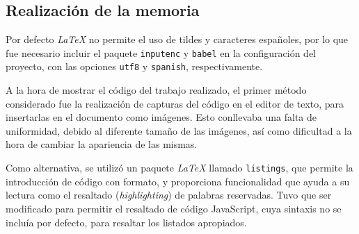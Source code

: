 \subsection{Realización de la memoria}

Por defecto \textit{LaTeX} no permite el uso de tildes y caracteres españoles, por lo que fue necesario incluir el paquete \texttt{inputenc} y \texttt{babel} en la configuración del proyecto, con las opciones \texttt{utf8} y \texttt{spanish}, respectivamente.

A la hora de mostrar el código del trabajo realizado, el primer método considerado fue la realización de capturas del código en el editor de texto, para insertarlas en el documento como imágenes.
Esto conllevaba una falta de uniformidad, debido al diferente tamaño de las imágenes, así como dificultad a la hora de cambiar la apariencia de las mismas.

Como alternativa, se utilizó un paquete \textit{LaTeX} llamado \texttt{listings}, que permite la introducción de código con formato, y proporciona funcionalidad que ayuda a su lectura como el resaltado (\textit{highlighting}) de palabras reservadas.
%
Tuvo que ser modificado para permitir el resaltado de código JavaScript, cuya sintaxis no se incluía por defecto, para resaltar los listados apropiados.